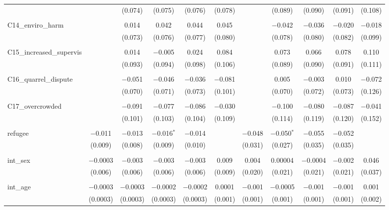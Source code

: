 \begin{table}[H]
\begin{tabular}{@{\extracolsep{4pt}}lcccccccccc}
  &  & (0.074) & (0.075) & (0.076) & (0.078) &  & (0.089) & (0.090) & (0.091) & (0.108) \\ 
  & & & & & & & & & & \\ 
 C14\_enviro\_harm &  & 0.014 & 0.042 & 0.044 & 0.045 &  & $-$0.042 & $-$0.036 & $-$0.020 & $-$0.018 \\ 
  &  & (0.073) & (0.076) & (0.077) & (0.080) &  & (0.078) & (0.080) & (0.082) & (0.099) \\ 
  & & & & & & & & & & \\ 
 C15\_increased\_supervis &  & 0.014 & $-$0.005 & 0.024 & 0.084 &  & 0.073 & 0.066 & 0.078 & 0.110 \\ 
  &  & (0.093) & (0.094) & (0.098) & (0.106) &  & (0.089) & (0.090) & (0.091) & (0.111) \\ 
  & & & & & & & & & & \\ 
 C16\_quarrel\_dispute &  & $-$0.051 & $-$0.046 & $-$0.036 & $-$0.081 &  & 0.005 & $-$0.003 & 0.010 & $-$0.072 \\ 
  &  & (0.070) & (0.071) & (0.073) & (0.101) &  & (0.070) & (0.072) & (0.073) & (0.126) \\ 
  & & & & & & & & & & \\ 
 C17\_overcrowded &  & $-$0.091 & $-$0.077 & $-$0.086 & $-$0.030 &  & $-$0.100 & $-$0.080 & $-$0.087 & $-$0.041 \\ 
  &  & (0.101) & (0.103) & (0.104) & (0.109) &  & (0.114) & (0.119) & (0.120) & (0.152) \\ 
  & & & & & & & & & & \\ 
 refugee & $-$0.011 & $-$0.013 & $-$0.016$^{*}$ & $-$0.014 &  & $-$0.048 & $-$0.050$^{*}$ & $-$0.055 & $-$0.052 &  \\ 
  & (0.009) & (0.008) & (0.009) & (0.010) &  & (0.031) & (0.027) & (0.035) & (0.035) &  \\ 
  & & & & & & & & & & \\ 
 int\_sex & $-$0.0003 & $-$0.003 & $-$0.003 & $-$0.003 & 0.009 & 0.004 & 0.00004 & $-$0.0004 & $-$0.002 & 0.046 \\ 
  & (0.006) & (0.006) & (0.006) & (0.006) & (0.009) & (0.020) & (0.021) & (0.021) & (0.021) & (0.037) \\ 
  & & & & & & & & & & \\ 
 int\_age & $-$0.0003 & $-$0.0003 & $-$0.0002 & $-$0.0002 & 0.0001 & $-$0.001 & $-$0.0005 & $-$0.001 & $-$0.001 & 0.001 \\ 
  & (0.0003) & (0.0003) & (0.0003) & (0.0003) & (0.001) & (0.001) & (0.001) & (0.001) & (0.001) & (0.002) \\ 

\end{tabular}
\end{table}
